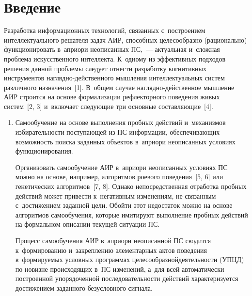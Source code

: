 
  
\vspace*{-4pt}



\thispagestyle{headings}

\begin{multicols}{2}

\label{st\stat}
 
\section{Введение}

  Разработка информационных технологий, связанных с~по\-стро\-ен\-ием 
интеллектуального решателя задач АИР, 
способных целесообразно (рационально) функционировать в~априори 
неописанных ПС,~--- актуальная и~слож\-ная проб\-ле\-ма 
искусственного интеллекта. К~одному из эффективных подходов решения 
данной проб\-ле\-мы следует отнести разработку когнитивных инструментов 
на\-гляд\-но-дей\-ст\-вен\-но\-го мышления интеллектуальных сис\-тем различного 
назначения~[1]. В~общем случае на\-гляд\-но-дей\-ст\-вен\-ное мыш\-ле\-ние АИР 
строится на основе формализации рефлекторного поведения живых сис\-тем~[2, 3] и~включает сле\-ду\-ющие три основные со\-став\-ля\-ющие~[4]. 
  \begin{enumerate}[1.]
  \item Самообучение на основе выполнения пробных действий и~механизмов 
избирательности по\-сту\-па\-ющей из ПС информации, 
обес\-пе\-чи\-ва\-ющих воз\-мож\-ность поиска заданных объектов в~априори 
неописанных условиях функционирования. 
  
  Организовать самообучение АИР в~априори неописанных условиях ПС 
можно на основе, например, алгоритмов роевого поведения~[5, 6] или 
генетических алгоритмов~[7, 8]. Однако непосредственная отработка проб\-ных 
действий может привести к~негативным изменениям, не связанным
 с~достижением заданной цели. Обойти этот недостаток можно на основе 
алгоритмов са\-мо\-обуче\-ния, которые имитируют выполнение проб\-ных действий 
на формальном описании текущей ситуации ПС.
  
  Процесс самообучения АИР в~априори неописанной ПС
сводится к~формированию и~закреплению элементарных актов поведения 
в~фор\-ми\-ру\-емых условных программах целесообразной\linebreak де\-я\-тель\-ности (УПЦД) по 
новизне происходящих в~ПС изменений, а~для всей 
автоматически по\-стро\-ен\-ной упорядоченной по\-сле\-до\-ва\-тель\-ности действий 
характеризуется \mbox{дос\-ти\-же\-ни\-ем} заданного безуслов\-но\-го сигнала. 
  

\end{enumerate}
\end{multicols}
